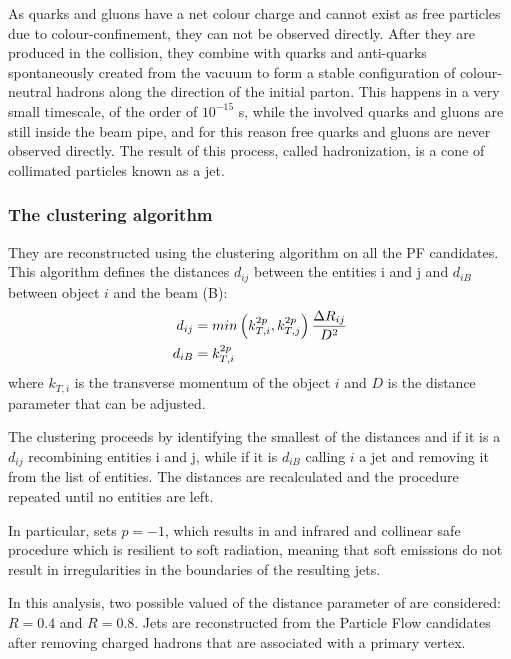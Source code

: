 As quarks and gluons have a net colour charge and cannot exist as free particles due to colour-confinement, they can not be observed directly.
After they are produced in the collision, they combine with quarks and anti-quarks spontaneously created from the vacuum
to form a stable configuration of colour-neutral hadrons along the direction of the initial parton.
This happens in a very small timescale, of the order of $10^{-15}$ s, while the involved quarks and gluons are still inside the beam pipe,
and for this reason free quarks and gluons are never observed directly.
The result of this process, called hadronization, is a cone of collimated particles known as a jet.

\subsubsection[The anti-kt clustering algorithm]{The \antikt clustering algorithm} %

They are reconstructed using the \antikt clustering algorithm \cite{Cacciari:2008gp} on all the PF candidates.
This algorithm defines the distances $d_{ij}$ between the entities i and j and $d_{iB}$ between object $i$ and the beam (B):
\begin{equation}
\begin{split}
d_{ij} &= min \left( k^{2p}_{T,i}, k^{2p}_{T,j} \right) \frac{\Delta R_{ij}}{D^2}\\
d_{iB} &= k^{2p}_{T,i}
\end{split}
\end{equation}
where $k_{T, i}$ is the transverse momentum of the object $i$ and $D$ is the distance parameter that can be adjusted.

The clustering proceeds by identifying the smallest of the distances and if it is a $d_{ij}$ recombining entities i and j,
while if it is $d_{iB}$ calling $i$ a jet and removing it from the list of entities.
The distances are recalculated and the procedure repeated until no entities are left.

In particular, \antikt sets $p = -1$, which results in and infrared and collinear safe procedure which is resilient to soft radiation,
meaning that soft emissions do not result in irregularities in the boundaries of the resulting jets.

In this analysis, two possible valued of the distance parameter of \antikt are considered: $R = 0.4$ and $R = 0.8$.
Jets are reconstructed from the Particle Flow candidates after removing charged hadrons that are associated with a \pileup{} primary vertex.
